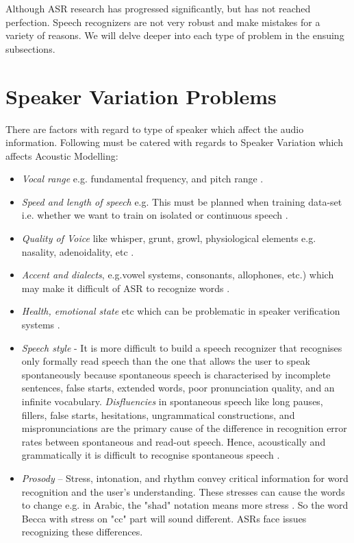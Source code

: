 Although ASR research has progressed significantly, but has not reached perfection. Speech recognizers are not very robust and make mistakes for a variety of reasons. We will delve deeper into each type of problem in the ensuing subsections.

\section{Speaker Variation Problems}
\label{sub:speaker_variation}
There are factors with regard to type of speaker which affect the audio information. Following must be catered with regards to Speaker Variation which affects Acoustic Modelling:
\begin{itemize}
    \item \textit{Vocal range} e.g. fundamental frequency, and pitch range \cite{vipperla_ageing_2010}. 
    \item \textit{Speed and length of speech} e.g. This must be planned when training data-set i.e. whether we want to train on isolated or continuous speech \cite{markus_forsberg_why_2003}. 
    \item \textit{Quality of Voice} like whisper, grunt, growl, physiological elements e.g. nasality, adenoidality, etc \cite{shrawankar_adverse_2013}. 
    \item \textit{Accent and dialects}, e.g.vowel systems, consonants, allophones, etc.) which may make it difficult of ASR to recognize words \cite{shrawankar_adverse_2013}. 
    \item \textit{Health, emotional state} etc which can be problematic in speaker verification systems \cite{backstrom_introduction_2022}.
    \item \textit{Speech style} - It is more difficult to build a speech recognizer that recognises only formally read speech than the one that allows the user to speak spontaneously because spontaneous speech is characterised by incomplete sentences, false starts, extended words, poor pronunciation quality, and an infinite vocabulary. \textit{Disfluencies} in spontaneous speech like long pauses, fillers, false starts, hesitations, ungrammatical constructions, and mispronunciations are the primary cause of the difference in recognition error rates between spontaneous and read-out speech. Hence, acoustically and grammatically it is difficult to recognise spontaneous speech \cite{shrawankar_adverse_2013}.
    \item \textit{Prosody} – Stress, intonation, and rhythm convey critical information for word recognition and the user's understanding. These stresses can cause the words to change e.g. in Arabic, the "shad" notation means more stress \cite{shrawankar_adverse_2013, markus_forsberg_why_2003}. So the word Becca with stress on "cc" part will sound different. ASRs face issues recognizing these differences.

\end{itemize}
